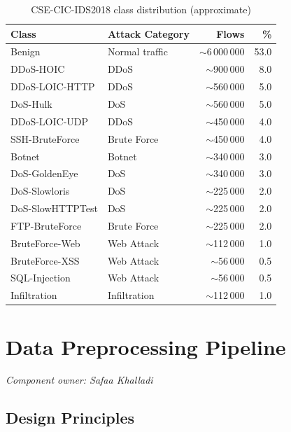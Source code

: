 \documentclass[12pt]{article}
\theoremstyle{plain}
\begin{document}
\begin{table}[H]
\centering
\caption{CSE-CIC-IDS2018 class distribution (approximate)}
\label{tab:class_dist}
\renewcommand{\arraystretch}{1.2}
\begin{tabular}{llrr}
\toprule
\rowcolor{lightblue}
\textbf{Class} & \textbf{Attack Category} & \textbf{Flows} & \textbf{\%} \\
\midrule
Benign          & Normal traffic   & $\sim$6\,000\,000 & 53.0 \\
DDoS-HOIC       & DDoS             & $\sim$900\,000    &  8.0 \\
DDoS-LOIC-HTTP  & DDoS             & $\sim$560\,000    &  5.0 \\
DoS-Hulk        & DoS              & $\sim$560\,000    &  5.0 \\
DDoS-LOIC-UDP   & DDoS             & $\sim$450\,000    &  4.0 \\
SSH-BruteForce  & Brute Force      & $\sim$450\,000    &  4.0 \\
Botnet          & Botnet           & $\sim$340\,000    &  3.0 \\
DoS-GoldenEye   & DoS              & $\sim$340\,000    &  3.0 \\
DoS-Slowloris   & DoS              & $\sim$225\,000    &  2.0 \\
DoS-SlowHTTPTest& DoS              & $\sim$225\,000    &  2.0 \\
FTP-BruteForce  & Brute Force      & $\sim$225\,000    &  2.0 \\
BruteForce-Web  & Web Attack       & $\sim$112\,000    &  1.0 \\
BruteForce-XSS  & Web Attack       & $\sim$56\,000     &  0.5 \\
SQL-Injection   & Web Attack       & $\sim$56\,000     &  0.5 \\
Infiltration    & Infiltration     & $\sim$112\,000    &  1.0 \\
\bottomrule
\end{tabular}
\end{table}

\newpage
\section{Data Preprocessing Pipeline}
\label{sec:preprocessing}
\textit{Component owner: Safaa Khalladi}

\subsection{Design Principles}
\end{document}
